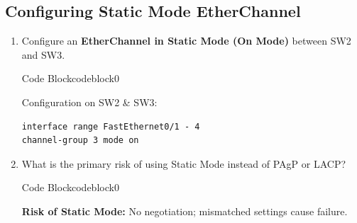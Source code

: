 \documentclass[a4paper]{article}
\begin{document}
\subsection{Configuring Static Mode EtherChannel}
\begin{enumerate}
	\item Configure an \textbf{EtherChannel in Static Mode (On Mode)} between SW2 and SW3.



	      \begin{ocg}{Code Block}{codeblock}{0}

		      \vspace{0.5cm}
		      Configuration on SW2 \& SW3:
		      \begin{lstlisting}
interface range FastEthernet0/1 - 4
channel-group 3 mode on
\end{lstlisting}

		      \vspace{0.5cm}
	      \end{ocg}




	\item What is the primary risk of using Static Mode instead of PAgP or LACP?



	      \begin{ocg}{Code Block}{codeblock}{0}

		      \vspace{0.5cm}
		      \begin{tcolorbox}
			      \textbf{Risk of Static Mode:} No negotiation; mismatched settings cause failure.
		      \end{tcolorbox}
		      \vspace{0.5cm}
	      \end{ocg}


\end{enumerate}
\end{document}
